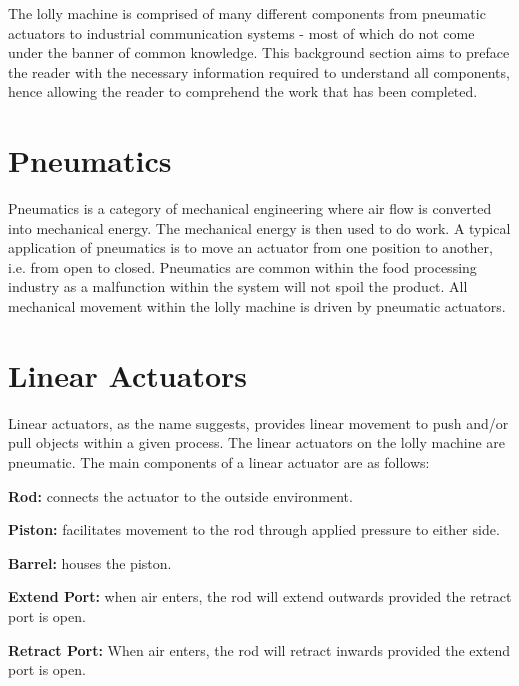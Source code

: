 

The lolly machine is comprised of many different components from pneumatic actuators to industrial communication systems - most of which do not come under the banner of common knowledge. This background section aims to preface the reader with the necessary information required to understand all components, hence allowing the reader to comprehend the work that has been completed. 

\section{Pneumatics}
    Pneumatics is a category of mechanical engineering  where air flow is converted into mechanical energy\cite{parr2011hydraulics}. The mechanical energy is then used to do work. A typical application of pneumatics is to move an actuator from one position to another, i.e. from open to closed. Pneumatics are common within the food processing industry as a malfunction within the system will not spoil the product.
    All mechanical movement within the lolly machine is driven by pneumatic actuators.
    
\section{Linear Actuators}
    Linear actuators, as the name suggests, provides linear movement to push and/or pull objects within a given process. The linear actuators on the lolly machine are pneumatic. The main components of a linear actuator are as follows:
    
    \begin{description} 
        \item\textbf{Rod:} connects the actuator to the outside environment.
        \item\textbf{Piston:} facilitates movement to the rod through applied pressure to either side.
        \item\textbf{Barrel:} houses the piston.
        \item\textbf{Extend Port:} when air enters, the rod will extend outwards provided the retract port is open.
        \item\textbf{Retract Port:} When air enters, the rod will retract inwards provided the extend port is open.
    \end{description}
    
